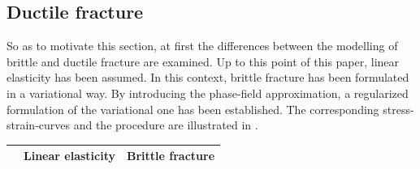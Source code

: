 \subsection{Ductile fracture} \label{sec:ductile_frac}
So as to motivate this section, at first the differences between the modelling of brittle and ductile fracture are examined. Up to this point of this paper, linear elasticity has been assumed. In this context, brittle fracture has been formulated in a variational way. By introducing the phase-field approximation, a regularized formulation of the variational one has been established. The corresponding stress-strain-curves and the procedure are illustrated in .
\begin{table}[!ht]
	\begin{center}
	\begin{tabular}{|c||c|c|c|}
		\cline{2-4}
			\multicolumn{1}{c||}{}& Linear elasticity & \multicolumn{2}{c|}{Brittle fracture} \\
 		\hline\hline

\end{tabular}
\end{center}
\end{table}
